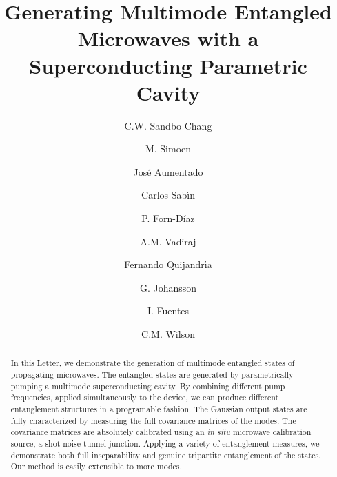 \documentclass[prl,10pt,twocolumn,superscriptaddress,notitlepage,floatfix,amssymb]{revtex4}
\begin{document}
\title{Generating Multimode Entangled Microwaves with a Superconducting Parametric Cavity}



\author{C.W. Sandbo Chang}
\author{M. Simoen}
\author{Jos{\'e} Aumentado}
\author{Carlos Sab{\'\i}n}
\author{P. Forn-D\'{i}az}
\author{A.M. Vadiraj}
\author{Fernando Quijandr\'{\i}a}
\author{G. Johansson}
\author{I. Fuentes}
\author{C.M. Wilson}


%
%


\begin{abstract}
In this Letter, we demonstrate the generation of multimode entangled states of propagating microwaves.  The entangled states are generated by parametrically pumping a multimode superconducting cavity. By combining different pump frequencies, applied simultaneously to the device, we can produce different entanglement structures in a programable fashion.  The Gaussian output states are fully characterized by measuring the full covariance matrices of the modes. The covariance matrices are absolutely calibrated using an \textit{in situ} microwave calibration source, a shot noise tunnel junction. Applying a variety of entanglement measures, we demonstrate both full inseparability and genuine tripartite entanglement of the states.  Our method is easily extensible to more modes. 
\end{abstract}
\end{document}
